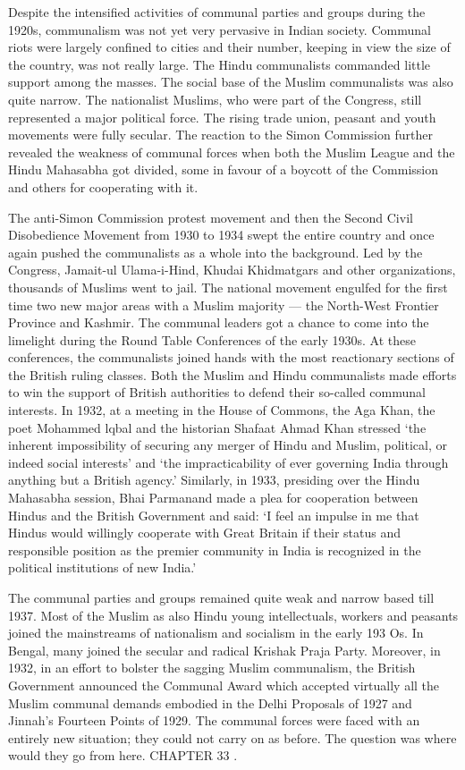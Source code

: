 Despite the intensified activities of communal parties and groups during the 1920s, communalism was not yet very pervasive in Indian society. Communal riots were largely confined to cities and their number, keeping in view the size of the country, was not really large. The Hindu communalists commanded little support among the masses. The social base of the Muslim communalists was also quite narrow. The nationalist Muslims, who were part of the Congress, still represented a major political force. The rising trade union, peasant and youth movements were fully secular. The reaction to the Simon Commission further revealed the weakness of communal forces when both the Muslim League and the Hindu Mahasabha got divided, some in favour of a boycott of the Commission and others for cooperating with it. 

The anti-Simon Commission protest movement and then the Second Civil Disobedience Movement from 1930 to 1934 swept the entire country and once again pushed the communalists as a whole into the background. Led by the Congress, Jamait-ul­ Ulama-i-Hind, Khudai Khidmatgars and other organizations, thousands of Muslims went to jail. The national movement engulfed for the first time two new major areas with a Muslim majority — the North-West Frontier Province and Kashmir. The communal leaders got a chance to come into the limelight during the Round Table Conferences of the early 1930s. At these conferences, the communalists joined hands with the most reactionary sections of the British ruling classes. Both the Muslim and Hindu communalists made efforts to win the support of British authorities to defend their so-called communal interests. In 1932, at a meeting in the House of Commons, the Aga Khan, the poet Mohammed lqbal and the historian Shafaat Ahmad Khan stressed `the inherent impossibility of securing any merger of Hindu and Muslim, political, or indeed social interests' and `the impracticability of ever governing India through anything but a British agency.' Similarly, in 1933, presiding over the Hindu Mahasabha session, Bhai Parmanand made a plea for cooperation between Hindus and the British Government and said: `I feel an impulse in me that Hindus would willingly cooperate with Great Britain if their status and responsible position as the premier community in India is recognized in the political institutions of new India.' 

The communal parties and groups remained quite weak and narrow based till 1937. Most of the Muslim as also Hindu young intellectuals, workers and peasants joined the mainstreams of nationalism and socialism in the early 193 Os. In Bengal, many joined the secular and radical Krishak Praja Party. Moreover, in 1932, in an effort to bolster the sagging Muslim communalism, the British Government announced the Communal Award which accepted virtually all the Muslim communal demands embodied in the Delhi Proposals of 1927 and Jinnah's Fourteen Points of 1929. The communal forces were faced with an entirely new situation; they could not carry on as before. The question was where would they go from here. CHAPTER 33 . 


